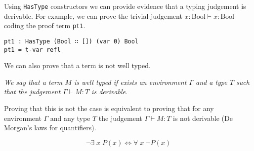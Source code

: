 \documentclass{article}
\begin{document}
Using \texttt{HasType} constructors we can provide evidence that a typing judgement is derivable.
For example, we can prove the trivial judgement $x : \text{Bool} \vdash x : \text{Bool}$ coding the proof term \texttt{pt1}.

\begin{verbatim}
pt1 : HasType (Bool ∷ []) (var 0) Bool
pt1 = t-var refl
\end{verbatim}

We can also prove that a term is not well typed.

\vspace{1em}
\noindent
\textit{We say that a term $M$ is well typed if exists an environment $\Gamma$ and a type $T$ such that the judgement $\Gamma \vdash M : T$ is derivable.}
\vspace{1em}

\noindent
Proving that this is not the case is equivalent to proving that for any environment $\Gamma$ and any type $T$ the judgement $\Gamma \vdash M : T$ is not derivable (De Morgan’s laws for quantifiers).

\[
\neg \exists \; x \; P(x) \iff \forall \; x \; \neg P(x)
\]
\end{document}
